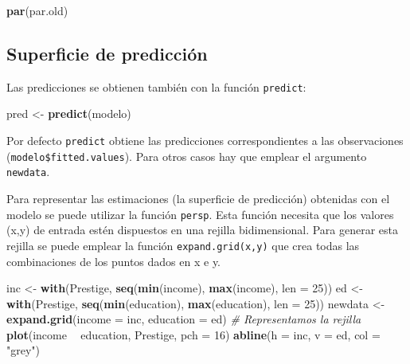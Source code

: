 \documentclass[]{book}
\newenvironment{Shaded}{\begin{snugshade}}{\end{snugshade}}
\newcommand{\KeywordTok}[1]{\textcolor[rgb]{0.13,0.29,0.53}{\textbf{#1}}}
\newcommand{\DataTypeTok}[1]{\textcolor[rgb]{0.13,0.29,0.53}{#1}}
\newcommand{\DecValTok}[1]{\textcolor[rgb]{0.00,0.00,0.81}{#1}}
\newcommand{\StringTok}[1]{\textcolor[rgb]{0.31,0.60,0.02}{#1}}
\newcommand{\CommentTok}[1]{\textcolor[rgb]{0.56,0.35,0.01}{\textit{#1}}}
\newcommand{\OperatorTok}[1]{\textcolor[rgb]{0.81,0.36,0.00}{\textbf{#1}}}
\newcommand{\NormalTok}[1]{#1}
\begin{document}
\begin{Shaded}
\begin{Highlighting}[]
\KeywordTok{par}\NormalTok{(par.old)}
\end{Highlighting}
\end{Shaded}

\subsection{Superficie de predicción}\label{superficie-de-prediccion}

Las predicciones se obtienen también con la función \texttt{predict}:

\begin{Shaded}
\begin{Highlighting}[]
\NormalTok{pred <-}\StringTok{ }\KeywordTok{predict}\NormalTok{(modelo)}
\end{Highlighting}
\end{Shaded}

Por defecto \texttt{predict} obtiene las predicciones correspondientes a
las observaciones (\texttt{modelo\$fitted.values}). Para otros casos hay
que emplear el argumento \texttt{newdata}.

Para representar las estimaciones (la superficie de predicción)
obtenidas con el modelo se puede utilizar la función \texttt{persp}.
Esta función necesita que los valores (x,y) de entrada estén dispuestos
en una rejilla bidimensional. Para generar esta rejilla se puede emplear
la función \texttt{expand.grid(x,y)} que crea todas las combinaciones de
los puntos dados en x e y.

\begin{Shaded}
\begin{Highlighting}[]
\NormalTok{inc <-}\StringTok{ }\KeywordTok{with}\NormalTok{(Prestige, }\KeywordTok{seq}\NormalTok{(}\KeywordTok{min}\NormalTok{(income), }\KeywordTok{max}\NormalTok{(income), }\DataTypeTok{len =} \DecValTok{25}\NormalTok{))}
\NormalTok{ed <-}\StringTok{ }\KeywordTok{with}\NormalTok{(Prestige, }\KeywordTok{seq}\NormalTok{(}\KeywordTok{min}\NormalTok{(education), }\KeywordTok{max}\NormalTok{(education), }\DataTypeTok{len =} \DecValTok{25}\NormalTok{))}
\NormalTok{newdata <-}\StringTok{ }\KeywordTok{expand.grid}\NormalTok{(}\DataTypeTok{income =}\NormalTok{ inc, }\DataTypeTok{education =}\NormalTok{ ed)}
\CommentTok{# Representamos la rejilla}
\KeywordTok{plot}\NormalTok{(income }\OperatorTok{~}\StringTok{ }\NormalTok{education, Prestige, }\DataTypeTok{pch =} \DecValTok{16}\NormalTok{)}
\KeywordTok{abline}\NormalTok{(}\DataTypeTok{h =}\NormalTok{ inc, }\DataTypeTok{v =}\NormalTok{ ed, }\DataTypeTok{col =} \StringTok{"grey"}\NormalTok{)}
\end{Highlighting}
\end{Shaded}
\end{document}
